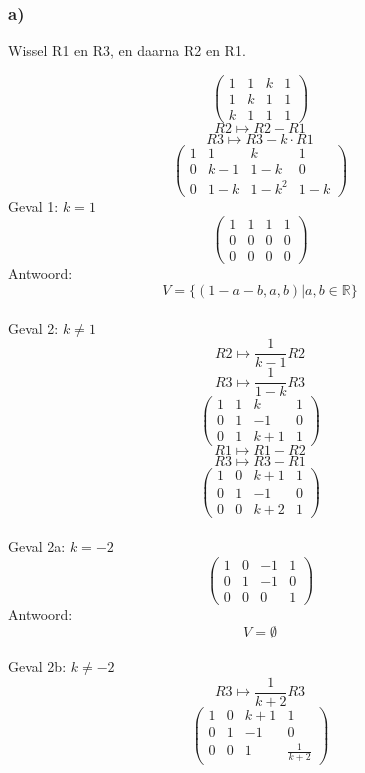 \documentclass[lineaire_algebra_oplossingen.tex]{subfiles}
\begin{document}
\subsubsection*{a)}
\begin{center}
Wissel R1 en R3, en daarna R2 en R1.
\end{center}
\[
\begin{pmatrix}
1 &  1 &  k & 1\\
1 &  k &  1 & 1\\
k &  1 &  1 & 1
\end{pmatrix}
\]
\[ R2 \longmapsto R2 - R1\]
\[ R3 \longmapsto R3 - k \cdot	R1\]
\[
\begin{pmatrix}
1 &  1 &  k & 1\\
0 & k-1& 1-k& 0\\
0 & 1-k & 1-k^2 & 1-k
\end{pmatrix}
\]
Geval 1: $k=1$
\[
\begin{pmatrix}
1 &  1 & 1 & 1\\
0 &  0 & 0 & 0\\
0 &  0 & 0 & 0
\end{pmatrix}
\]
Antwoord:
\[
V=\{ (1-a-b,a,b) | a,b \in \mathbb{R}\}
\]\\
Geval 2: $k\neq 1$\\ 
\[ R2 \longmapsto \frac{1}{k-1}R2\]
\[ R3 \longmapsto \frac{1}{1-k}R3\]
\[
\begin{pmatrix}
1 &  1 &  k & 1\\
0 &  1 & -1 & 0\\
0 &  1 & k+1& 1
\end{pmatrix}
\]
\[ R1 \longmapsto R1-R2\]
\[ R3 \longmapsto R3-R1\]
\[
\begin{pmatrix}
1 &  0 &  k+1 & 1\\
0 &  1 & -1 & 0\\
0 &  0 & k+2& 1
\end{pmatrix}
\]\\
Geval 2a: $k = -2$\\
\[
\begin{pmatrix}
1 &  0 & -1 & 1\\
0 &  1 & -1 & 0\\
0 &  0 &  0 & 1
\end{pmatrix}
\]
Antwoord:
\[
V=\emptyset
\]\\
Geval 2b: $k\neq-2$\\
\[ R3 \longmapsto \frac{1}{k+2}R3\]
\[
\begin{pmatrix}
1 &  0 &  k+1 & 1\\
0 &  1 & -1 & 0\\
0 &  0 &  1 & \frac{1}{k+2}
\end{pmatrix}
\]
\end{document}
